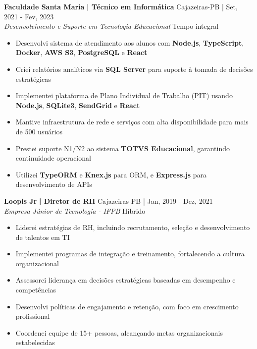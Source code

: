 \documentclass[a4paper]{article}
\begin{document}
\textbf{Faculdade Santa Maria}\textbf{ | Técnico em Informática} \hfill Cajazeiras-PB | Set, 2021 - Fev, 2023\\
\textit{Desenvolvimento e Suporte em Tecnologia Educacional} \hfill Tempo integral\\
\vspace{-3mm}
\begin{itemize} \itemsep -3pt
    \item Desenvolvi sistema de atendimento aos alunos com \textbf{Node.js}, \textbf{TypeScript}, \textbf{Docker}, \textbf{AWS S3}, \textbf{PostgreSQL} e \textbf{React}
    \item Criei relatórios analíticos via \textbf{SQL Server} para suporte à tomada de decisões estratégicas
    \item Implementei plataforma de Plano Individual de Trabalho (PIT) usando \textbf{Node.js}, \textbf{SQLite3}, \textbf{SendGrid} e \textbf{React}
    \item Mantive infraestrutura de rede e serviços com alta disponibilidade para mais de 500 usuários
    \item Prestei suporte N1/N2 ao sistema \textbf{TOTVS Educacional}, garantindo continuidade operacional
    \item Utilizei \textbf{TypeORM} e \textbf{Knex.js} para ORM, e \textbf{Express.js} para desenvolvimento de APIs
\end{itemize}

\textbf{Loopis Jr}\textbf{ | Diretor de RH} \hfill Cajazeiras-PB | Jan, 2019 - Dez, 2021\\
\textit{Empresa Júnior de Tecnologia - IFPB} \hfill Híbrido\\
\vspace{-3mm}
\begin{itemize} \itemsep -3pt
    \item Liderei estratégias de RH, incluindo recrutamento, seleção e desenvolvimento de talentos em TI
    \item Implementei programas de integração e treinamento, fortalecendo a cultura organizacional
    \item Assessorei liderança em decisões estratégicas baseadas em desempenho e competências
    \item Desenvolvi políticas de engajamento e retenção, com foco em crescimento profissional
    \item Coordenei equipe de 15+ pessoas, alcançando metas organizacionais estabelecidas
\end{itemize}
\end{document}
